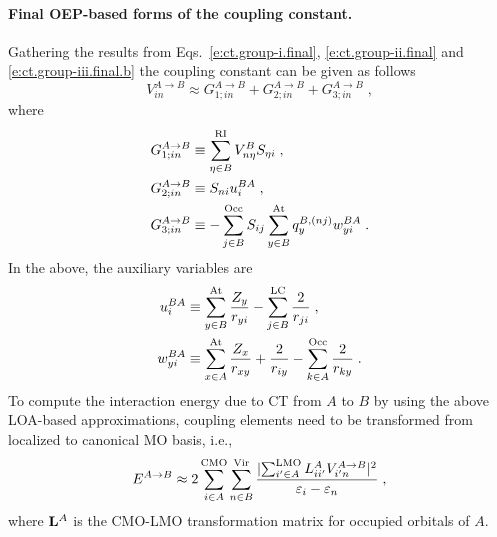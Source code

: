 \paragraph{Final OEP-based forms of the coupling constant.}
Gathering the results from Eqs.~\eqref{e:ct.group-i.final},
\eqref{e:ct.group-ii.final} and \eqref{e:ct.group-iii.final.b} the coupling constant
can be given as follows
%
\begin{equation} \label{e:ct-murell-etal.vin.oep}
V_{in}^{A\rightarrow B} 
       \approx 
 G_{1;in}^{A\rightarrow B} 
+G_{2;in}^{A\rightarrow B} 
+G_{3;in}^{A\rightarrow B} \;,
\end{equation}
%
where
%
\begin{subequations} \label{e:ct-murrell-etal.vin.oep-gterms}
\begin{align}
 G_{1;in}^{A\rightarrow B} &\equiv \sum_{\eta\in B}^{\rm RI} V^B_{n\eta} S_{\eta i} \;, \\
 G_{2;in}^{A\rightarrow B} &\equiv S_{ni} u_i^{BA} \;, \\
 G_{3;in}^{A\rightarrow B} &\equiv
 -\sum_{j   \in B}^{\rm Occ} S_{ij}
  \sum_{y   \in B}^{\rm At} q_y^{B,(nj)} w_{yi}^{BA}
\;.
\end{align}
\end{subequations}
%
In the above, the auxiliary variables are
%
\begin{subequations} \label{e:ct-murell-etal.vin.oep.aux-var}
\begin{align} \label{e:ct-murell-etal.vin.oep.aux-var.u} 
 u_i^{BA} &\equiv    
 \sum_{y\in B}^{\rm At}
  \frac{Z_y}{ r_{yi} } 
 -
 \sum_{j\in B}^{\rm LC}
  \frac{2}{r_{ji}} 
                \;, \\ 
 w_{yi}^{BA} &\equiv 
   \sum_{x\in A}^{\rm At}
   \frac{Z_x}{r_{xy}}
  + \frac{2}{r_{iy}}
  - \sum_{k\in A}^{\rm Occ}
    \frac{2}{r_{ky}} 
                \;.
  \label{e:ct-murell-etal.vin.oep.aux-var.w}
\end{align}
\end{subequations}
%
To compute the interaction energy due to CT from $A$ to $B$ by using the above LOA\hyp{}based
approximations, coupling elements need to be transformed from localized to canonical MO basis, i.e.,
%
\begin{equation} \label{e:ect-oep.prefinal}
 E^{A\rightarrow B} \approx 
 2 
 \sum_{i\in A}^{\rm CMO}
 \sum_{n\in B}^{\rm Vir}
 \frac{
 \lvert
   \sum_{i'\in A}^{\rm LMO} L_{ii'}^A
   V_{i'n}^{A\rightarrow B}
 \rvert^2 }{\varepsilon_i - \varepsilon_n} \;,
\end{equation}
%
where ${\bf L}^A$ is the CMO\hyp{}LMO transformation matrix for occupied orbitals of $A$. 
